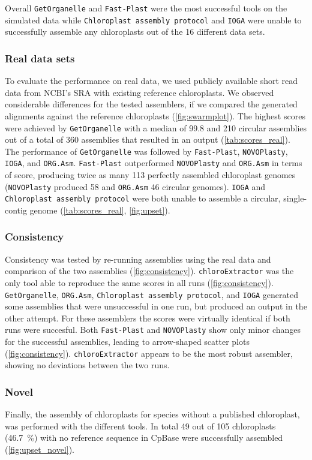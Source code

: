 \documentclass{bmcart}
\newcommand{\formatprogramnames}[1]{\texttt{#1}}
\newcommand{\ce}{\formatprogramnames{chloroExtractor}}
\newcommand{\oa}{\formatprogramnames{ORG.Asm}}
\newcommand{\fp}{\formatprogramnames{Fast-Plast}}
\newcommand{\ioga}{\formatprogramnames{IOGA}}
\newcommand{\np}{\formatprogramnames{NOVOPlasty}}
\newcommand{\go}{\formatprogramnames{GetOrganelle}}
\newcommand{\cassp}{\formatprogramnames{Chloroplast assembly protocol}}
\begin{document}
Overall \go{} and \fp{} were the most successful tools on the simulated data while \cassp{} and \ioga{} were unable to successfully assemble any chloroplasts out of the \num{16} different data sets.

\subsubsection*{Real data sets}
To evaluate the performance on real data, we used publicly available short read data from NCBI's SRA with existing reference chloroplasts.
We observed considerable differences for the tested assemblers, if we compared the generated alignments against the reference chloroplasts (\cref{fig:swarmplot}).
The highest scores were achieved by \go{} with a median of \num{99.8} and \num{210} circular assemblies out of a total of 360 assemblies that resulted in an output (\cref{tab:scores_real}).
The performance of \go{} was followed by \fp{}, \np{}, \ioga{}, and \oa{}.
\fp{} outperformed \np{} and \oa{} in terms of score, producing twice as many \num{113} perfectly assembled chloroplast genomes (\np{} produced \num{58} and \oa{} \num{46} circular genomes).
\ioga{} and \cassp{} were both unable to assemble a circular, single-contig genome (\cref{tab:scores_real}, \cref{fig:upset}).

\subsubsection*{Consistency}
Consistency was tested by re-running assemblies using the real data and comparison of the two assemblies (\cref{fig:consistency}).
\ce{} was the only tool able to reproduce the same scores in all runs (\cref{fig:consistency}).
\go{}, \oa{}, \cassp{}, and \ioga{} generated some assemblies that were unsuccessful in one run, but produced an output in the other attempt.
For these assemblers the scores were virtually identical if both runs were succesful.
Both \fp{} and \np{} show only minor changes for the successful assemblies, leading to arrow-shaped scatter plots (\cref{fig:consistency}).
\ce{} appears to be the most robust assembler, showing no deviations between the two runs.

\subsubsection*{Novel}
Finally, the assembly of chloroplasts for species without a published chloroplast, was performed with the different tools.
In total \num{49} out of \num{105} chloroplasts (\SI{46.7}{\percent}) with no reference sequence in CpBase were successfully assembled (\cref{fig:upset_novel}).
\end{document}
